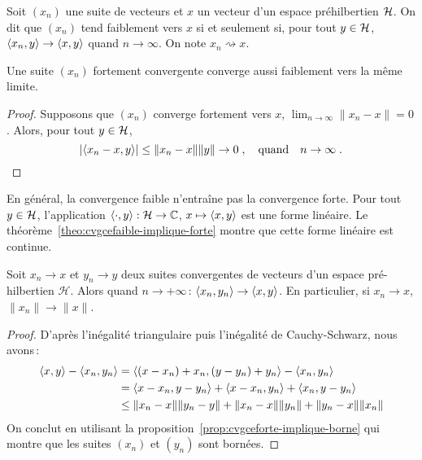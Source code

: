 \begin{definition}
Soit $(x_n)$ une suite de vecteurs  et $x$ un vecteur d'un espace
pr\'{e}hilbertien $\mathcal{H}$. On dit que $(x_n)$ tend faiblement
vers $x$ si et seulement si, pour tout $y \in \mathcal{H}$, $\left\langle x_n, y \right\rangle \to \left\langle x, y \right\rangle$ quand $n \to \infty$.
On note $x_n \rightsquigarrow x$.
\end{definition}
\begin{theorem}
\label{theo:cvgcefaible-implique-forte}
Une suite $(x_n)$ fortement convergente converge aussi faiblement vers la m\^{e}me limite.
\end{theorem}
\begin{proof}\smartqed
Supposons que $(x_n)$ converge fortement vers $x$, $\lim_{n \to \infty} \| x_n-x\|=0$. Alors,
pour tout $y \in \mathcal{H}$,
\[
\left| \left\langle x_n-x, y \right\rangle \right| \leq \| x_n - x \| \| y \| \to 0 \;, \quad \text{quand} \quad n \to \infty \;.
\]

\end{proof}
En g\'{e}n\'{e}ral, la convergence faible n'entra\^{i}ne pas la convergence forte.
Pour tout $y \in \mathcal{H}$, l'application $\left\langle \cdot, y \right\rangle: \mathcal{H} \to \mathbb{C}$, $x \mapsto \left\langle x, y \right\rangle$ est une forme
lin\'{e}aire. Le th\'{e}or\`{e}me~\ref{theo:cvgcefaible-implique-forte} montre que cette forme lin\'{e}aire est continue.
\begin{theorem}
\label{theo:cont_prod_int} Soit $x_n \rightarrow x$ et $y_n
\rightarrow y$ deux suites convergentes de vecteurs d'un espace
pr\'{e}-hilbertien $\mathcal{H}$. Alors quand $n\rightarrow
+\infty$\,: $\left\langle x_n, y_n \right\rangle \rightarrow \left\langle x, y \right\rangle$. En particulier, si $x_n
\rightarrow x$, $\| x_n \| \rightarrow \|x\|$.
\end{theorem}
\begin{proof}\smartqed
D'apr\`{e}s l'in\'{e}galit\'{e} triangulaire puis l'in\'{e}galit\'{e} de Cauchy-Schwarz,
nous avons\,:
\begin{align*}
\left\langle x, y \right\rangle-\left\langle x_n, y_n \right\rangle
 &= \left\langle (x - x_n) + x_n,  (y - y_n) + y_n \right\rangle - \left\langle x_n, y_n \right\rangle \\
 &= \left\langle x-x_n, y-y_n \right\rangle + \left\langle x-x_n, y_n \right\rangle+ \left\langle x_n, y-y_n \right\rangle \\
 &\leq \|x_n-x\|\|y_n-y\|+\|x_n-x\|\|y_n\|+\|y_n-x\|\|x_n\|
\end{align*}
On conclut en utilisant la proposition~\ref{prop:cvgceforte-implique-borne} qui montre que
les suites $(x_n)$ et $(y_n)$ sont born\'{e}es.

\end{proof}


